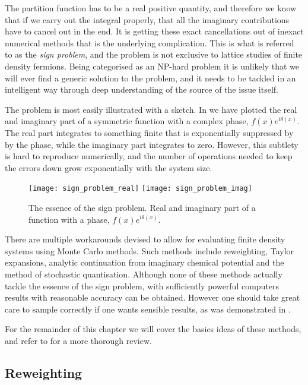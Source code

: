 The partition function has to be a real positive quantity, and therefore we know
that if we carry out the integral properly, that all the imaginary contributions
have to cancel out in the end. It is getting these exact cancellations out of
inexact numerical methods that is the underlying complication. This is what is
referred to as the \emph{sign problem}, and the problem is not exclusive to
lattice studies of finite density fermions. Being categorised as an NP-hard
problem it is unlikely that we will ever find a generic solution to the problem,
and it needs to be tackled in an intelligent way through deep understanding of
the source of the issue itself.

The problem is most easily illustrated with a sketch. In
 we have plotted the real and imaginary part of a
symmetric function with a complex phase, $f(x) e^{i \theta(x)}$. The real part
integrates to something finite that is exponentially suppressed by by the phase,
while the imaginary part integrates to zero. However, this subtlety is hard to
reproduce numerically, and the number of operations needed to keep the errors
down grow exponentially with the system size.
%
\begin{figure}
  \texttt{[image: sign\_problem\_real]}
  \texttt{[image: sign\_problem\_imag]}
  \caption{The essence of the sign problem. Real and imaginary part of a
    function with a phase, $f(x) e^{i \theta(x)}$.}
  \label{fig-sign-problem}
\end{figure}


There are multiple workarounds devised to allow for evaluating finite density
systems using Monte Carlo methods. Such methods include reweighting, Taylor
expansions, analytic continuation from imaginary chemical potential and  the
method of stochastic quantisation. Although none of these methods actually
tackle the essence of the sign problem, with sufficiently powerful computers 
results with reasonable accuracy can be obtained. However one should take great
care to sample correctly if one wants sensible results, as was demonstrated in
\citep{Osborn:2008eg}.

For the remainder of this chapter we will cover the basics ideas of these
methods, and refer to \citep{deForcrand:2010ys} for a more thorough review.

\subsection{Reweighting}

